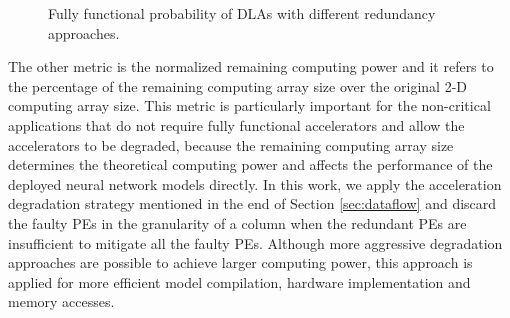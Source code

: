 \begin{figure}
\setlength{\abovecaptionskip}{-10pt}
\setlength{\belowcaptionskip}{-2pt}
    \caption{Fully functional probability of DLAs with different redundancy approaches.}
\label{fig:survival}
\vspace{-1.5em}
\end{figure}

The other metric is the normalized remaining computing power and it refers to the percentage of the remaining computing array size over the original 2-D computing array size. This metric is particularly important for the non-critical applications that do not require fully functional accelerators and allow the accelerators to be degraded, because the remaining computing array size determines the theoretical computing power and affects the performance of the deployed neural network models directly. In this work, we apply the acceleration degradation strategy mentioned in the end of Section \ref{sec:dataflow} and discard the faulty PEs in the granularity of a column when the redundant PEs are insufficient to mitigate all the faulty PEs. Although more aggressive degradation approaches are possible to achieve larger computing power, this approach is applied for more efficient model compilation, hardware implementation and memory accesses. 

